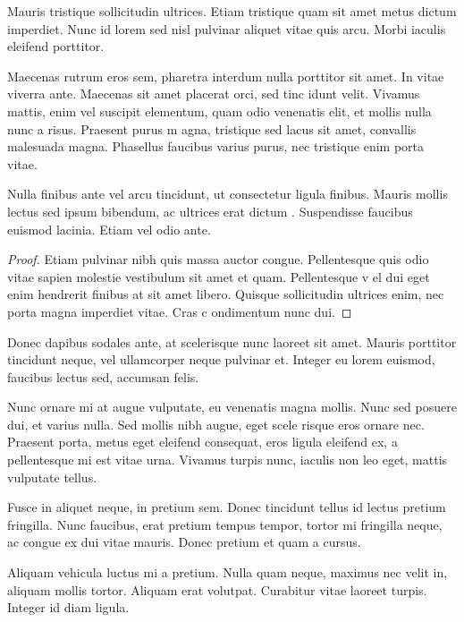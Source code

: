 \begin{definition}
Mauris tristique sollicitudin ultrices. Etiam tristique quam sit amet metus dictum imperdiet. Nunc id lorem sed nisl pulvinar aliquet 
vitae quis arcu. Morbi iaculis eleifend porttitor.
\end{definition}

Maecenas rutrum eros sem, pharetra interdum nulla porttitor sit amet. In vitae viverra ante. Maecenas sit amet placerat orci, sed tinc
idunt velit. Vivamus mattis, enim vel suscipit elementum, quam odio venenatis elit, et mollis nulla nunc a risus. Praesent purus m
agna, tristique sed lacus sit amet, convallis malesuada magna. Phasellus faucibus varius purus, nec tristique enim porta vitae.

\begin{theorem}
Nulla finibus ante vel arcu tincidunt, ut consectetur ligula finibus. Mauris mollis lectus sed ipsum bibendum, ac ultrices erat dictum
. Suspendisse faucibus euismod lacinia. Etiam vel odio ante.
\end{theorem}
\begin{proof}
Etiam pulvinar nibh quis massa auctor congue. Pellentesque quis odio vitae sapien molestie vestibulum sit amet et quam. Pellentesque v
el dui eget enim hendrerit finibus at sit amet libero. Quisque sollicitudin ultrices enim, nec porta magna imperdiet vitae. Cras c
ondimentum nunc dui.
\end{proof}

Donec dapibus sodales ante, at scelerisque nunc laoreet sit amet. Mauris porttitor tincidunt neque, vel ullamcorper neque pulvinar et.
 Integer eu lorem euismod, faucibus lectus sed, accumsan felis. 

\begin{remark}
Nunc ornare mi at augue vulputate, eu venenatis magna mollis. Nunc sed posuere dui, et varius nulla. Sed mollis nibh augue, eget scele
risque eros ornare nec. Praesent porta, metus eget eleifend consequat, eros ligula eleifend ex, a pellentesque mi est vitae urna. 
Vivamus turpis nunc, iaculis non leo eget, mattis vulputate tellus.
\end{remark}

Fusce in aliquet neque, in pretium sem. Donec tincidunt tellus id lectus pretium fringilla. Nunc faucibus, erat pretium tempus tempor,
 tortor mi fringilla neque, ac congue ex dui vitae mauris. Donec pretium et quam a cursus.

\begin{note}
Aliquam vehicula luctus mi a pretium. Nulla quam neque, maximus nec velit in, aliquam mollis tortor. Aliquam erat volutpat. Curabitur 
vitae laoreet turpis. Integer id diam ligula.
\end{note}

